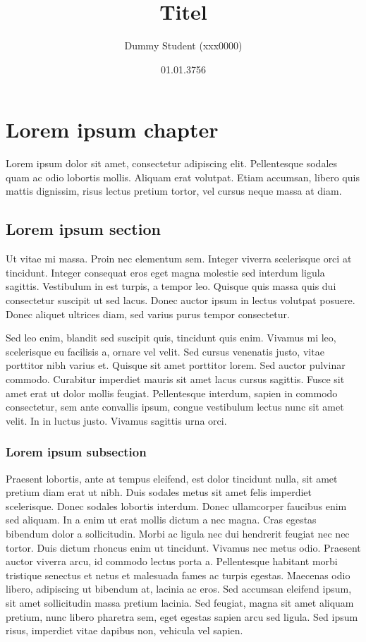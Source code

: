\documentclass[a4paper,parskip=half,oneside]{scrbook}
\begin{document}
\title{Titel}
\author{Dummy Student (xxx0000)}
\date{01.01.3756}

\maketitle
\thispagestyle{empty}
\clearpage
\newpage

\tableofcontents
\newpage


\chapter{Lorem ipsum chapter}
Lorem ipsum dolor sit amet, consectetur adipiscing elit. Pellentesque sodales quam ac odio lobortis mollis. Aliquam erat volutpat. Etiam accumsan, libero quis mattis dignissim, risus lectus pretium tortor, vel cursus neque massa at diam.

\section{Lorem ipsum section}
Ut vitae mi massa. Proin nec elementum sem. Integer viverra scelerisque orci at tincidunt. Integer consequat eros eget magna molestie sed interdum ligula sagittis. Vestibulum in est turpis, a tempor leo. Quisque quis massa quis dui consectetur suscipit ut sed lacus. Donec auctor ipsum in lectus volutpat posuere. Donec aliquet ultrices diam, sed varius purus tempor consectetur.

Sed leo enim, blandit sed suscipit quis, tincidunt quis enim. Vivamus mi leo, scelerisque eu facilisis a, ornare vel velit. Sed cursus venenatis justo, vitae porttitor nibh varius et. Quisque sit amet porttitor lorem. Sed auctor pulvinar commodo. Curabitur imperdiet mauris sit amet lacus cursus sagittis. Fusce sit amet erat ut dolor mollis feugiat. Pellentesque interdum, sapien in commodo consectetur, sem ante convallis ipsum, congue vestibulum lectus nunc sit amet velit. In in luctus justo. Vivamus sagittis urna orci.

\subsection{Lorem ipsum subsection}
Praesent lobortis, ante at tempus eleifend, est dolor tincidunt nulla,
sit amet pretium diam erat ut nibh. Duis sodales metus sit amet felis
imperdiet scelerisque. Donec sodales lobortis interdum. Donec ullamcorper
faucibus enim sed aliquam. In a enim ut erat mollis dictum a nec magna.
Cras egestas bibendum dolor a sollicitudin. Morbi ac ligula nec dui hendrerit
feugiat nec nec tortor. Duis dictum rhoncus enim ut tincidunt. Vivamus nec
metus odio. Praesent auctor viverra arcu, id commodo lectus porta a.
Pellentesque habitant morbi tristique senectus et netus et malesuada fames
ac turpis egestas. Maecenas odio libero, adipiscing ut bibendum at,
lacinia ac eros. Sed accumsan eleifend ipsum, sit amet sollicitudin
massa pretium lacinia. Sed feugiat, magna sit amet aliquam pretium, nunc
libero pharetra sem, eget egestas sapien arcu sed ligula. Sed ipsum risus,
imperdiet vitae dapibus non, vehicula vel sapien.
\end{document}
